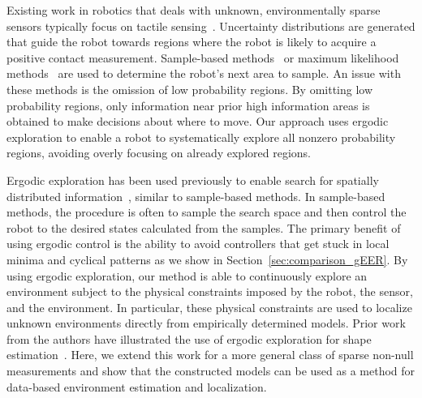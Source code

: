 \documentclass[conference]{IEEEtran}
\begin{document}
Existing work in robotics that deals with unknown, environmentally sparse sensors typically focus on tactile sensing~\cite{pezzementiTRO11tactileAppear, matsubara2016active,mur2015probabilistic,lepora2013active, fox2012tactile, meierTRO11probApproachTactileShape, dune2008active, lepora2013active, yi2016active, martinezRAS17activeBayesSensormotor}.
Uncertainty distributions are generated that guide the robot towards regions where the robot is likely to acquire a positive contact measurement.
Sample-based methods~\cite{pezzementiTRO11tactileAppear, matsubara2016active,mur2015probabilistic,lepora2013active, dune2008active, fox2012tactile} or maximum likelihood methods~\cite{meierTRO11probApproachTactileShape, dune2008active, lepora2013active, yi2016active, martinezRAS17activeBayesSensormotor} are used to determine the robot's next area to sample.
An issue with these methods is the omission of low probability regions.
By omitting low probability regions, only information near prior high information areas is obtained to make decisions about where to move.
Our approach uses ergodic exploration to enable a robot to systematically explore all nonzero probability regions, avoiding overly focusing on already explored regions.

Ergodic exploration has been used previously to enable search for spatially distributed information~\cite{miller2016ergodic, miller2015optimalrange, mavrommati2017eSAC}, similar to sample-based methods.
In sample-based methods, the procedure is often to sample the search space and then control the robot to the desired states calculated from the samples.
The primary benefit of using ergodic control is the ability to avoid controllers that get stuck in local minima and cyclical patterns as we show in Section~\ref{sec:comparison_gEER}. 
By using ergodic exploration, our method is able to continuously explore an environment subject to the physical constraints imposed by the robot, the sensor, and the environment. 
In particular, these physical constraints are used to localize unknown environments directly from empirically determined models.
Prior work from the authors have illustrated the use of ergodic exploration for shape estimation~\cite{abrahamRAL17}.
Here, we extend this work for a more general class of sparse non-null measurements and show that the constructed models can be used as a method for data-based environment estimation and localization.


 
\end{document}
